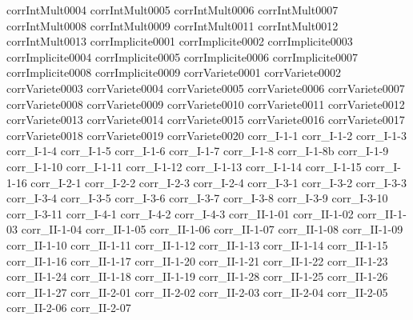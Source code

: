 {corrIntMult0004}
{corrIntMult0005}
{corrIntMult0006}
{corrIntMult0007}
{corrIntMult0008}
{corrIntMult0009}
{corrIntMult0011}
{corrIntMult0012}
{corrIntMult0013}
{corrImplicite0001}
{corrImplicite0002}
{corrImplicite0003}
{corrImplicite0004}
{corrImplicite0005}
{corrImplicite0006}
{corrImplicite0007}
{corrImplicite0008}
{corrImplicite0009}
{corrVariete0001}
{corrVariete0002}
{corrVariete0003}
{corrVariete0004}
{corrVariete0005}
{corrVariete0006}
{corrVariete0007}
{corrVariete0008}
{corrVariete0009}
{corrVariete0010}
{corrVariete0011}
{corrVariete0012}
{corrVariete0013}
{corrVariete0014}
{corrVariete0015}
{corrVariete0016}
{corrVariete0017}
{corrVariete0018}
{corrVariete0019}
{corrVariete0020}
{corr_I-1-1}
{corr_I-1-2}
{corr_I-1-3}
{corr_I-1-4}
{corr_I-1-5}
{corr_I-1-6}
{corr_I-1-7}
{corr_I-1-8}
{corr_I-1-8b}
{corr_I-1-9}
{corr_I-1-10}
{corr_I-1-11}
{corr_I-1-12}
{corr_I-1-13}
{corr_I-1-14}
{corr_I-1-15}
{corr_I-1-16}
{corr_I-2-1}
{corr_I-2-2}
{corr_I-2-3}
{corr_I-2-4}
{corr_I-3-1}
{corr_I-3-2}
{corr_I-3-3}
{corr_I-3-4}
{corr_I-3-5}
{corr_I-3-6}
{corr_I-3-7}
{corr_I-3-8}
{corr_I-3-9}
{corr_I-3-10}
{corr_I-3-11}
{corr_I-4-1}
{corr_I-4-2}
{corr_I-4-3}
{corr_II-1-01}
{corr_II-1-02}
{corr_II-1-03}
{corr_II-1-04}
{corr_II-1-05}
{corr_II-1-06}
{corr_II-1-07}
{corr_II-1-08}
{corr_II-1-09}
{corr_II-1-10}
{corr_II-1-11}
{corr_II-1-12}
{corr_II-1-13}
{corr_II-1-14}
{corr_II-1-15}
{corr_II-1-16}
{corr_II-1-17}
{corr_II-1-20}
{corr_II-1-21}
{corr_II-1-22}
{corr_II-1-23}
{corr_II-1-24}
{corr_II-1-18}
{corr_II-1-19}
{corr_II-1-28}
{corr_II-1-25}
{corr_II-1-26}
{corr_II-1-27}
{corr_II-2-01}
{corr_II-2-02}
{corr_II-2-03}
{corr_II-2-04}
{corr_II-2-05}
{corr_II-2-06}
{corr_II-2-07}
